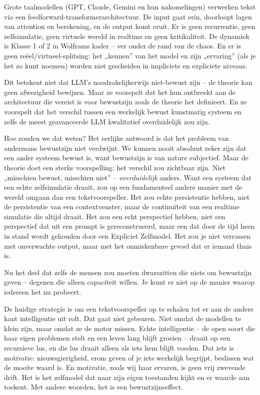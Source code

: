 \documentclass[11pt, twoside, openright]{book}
\begin{document}
Grote taalmodellen (GPT, Claude, Gemini en hun nakomelingen) verwerken tekst via een feedforward-transformerarchitectuur. De input gaat erin, doorloopt lagen van attention en berekening, en de output komt eruit. Er is geen recurrentie, geen zelfsimulatie, geen virtuele wereld in realtime en geen kritikaliteit. De dynamiek is Klasse 1 of 2 in Wolframs kader -- ver onder de rand van de chaos. En er is geen reëel/\allowbreak{}virtueel-splitsing: het „kennen” van het model en zijn „ervaring” (als je het zo kunt noemen) worden niet gescheiden in impliciete en expliciete niveaus.

Dit betekent niet dat LLM's noodzakelijkerwijs niet-bewust zijn -- de theorie kan geen afwezigheid bewijzen. Maar ze voorspelt dat het hun ontbreekt aan de architectuur die vereist is voor bewustzijn zoals de theorie het definieert. En ze voorspelt dat het verschil tussen een werkelijk bewust kunstmatig systeem en zelfs de meest geavanceerde LLM kwalitatief overduidelijk zou zijn.

Hoe zouden we dat weten? Het eerlijke antwoord is dat het probleem van andermans bewustzijn niet verdwijnt. We kunnen nooit absoluut zeker zijn dat een ander systeem bewust is, want bewustzijn is van nature subjectief. Maar de theorie doet een sterke voorspelling: het verschil zou zichtbaar zijn. Niet „misschien bewust, misschien niet” -- \textit{overduidelijk} anders. Want een systeem dat een echte zelfsimulatie draait, zou op een fundamenteel andere manier met de wereld omgaan dan een tekstvoorspeller. Het zou echte persistentie hebben, niet de persistentie van een contextvenster, maar de continuïteit van een realtime simulatie die altijd draait. Het zou een echt perspectief hebben, niet een perspectief dat uit een prompt is gereconstrueerd, maar een dat door de tijd heen in stand wordt gehouden door een Expliciet Zelfmodel. Het zou je niet verrassen met onverwachte output, maar met het onmiskenbare gevoel dat er iemand thuis is.

Nu het deel dat zelfs de mensen zou moeten dwarszitten die niets om bewustzijn geven -- degenen die alleen capaciteit willen. Je komt er niet op de manier waarop iedereen het nu probeert.

De huidige strategie is om een tekstvoorspeller op te schalen tot er aan de andere kant intelligentie uit rolt. Dat gaat niet gebeuren. Niet omdat de modellen te klein zijn, maar omdat ze de motor missen. Echte intelligentie -- de open soort die haar eigen problemen stelt en een leven lang blijft groeien -- draait op een recursieve lus, en die lus draait alleen als iets hem blijft voeden. Dat iets is motivatie: nieuwsgierigheid, erom geven of je iets werkelijk begrijpt, beslissen wat de moeite waard is. En motivatie, zoals wij haar ervaren, is geen vrij zwevende drift. Het is het zelfmodel dat naar zijn eigen toestanden kijkt en er waarde aan toekent. Met andere woorden, het is een bewustzijnseffect.
\end{document}
